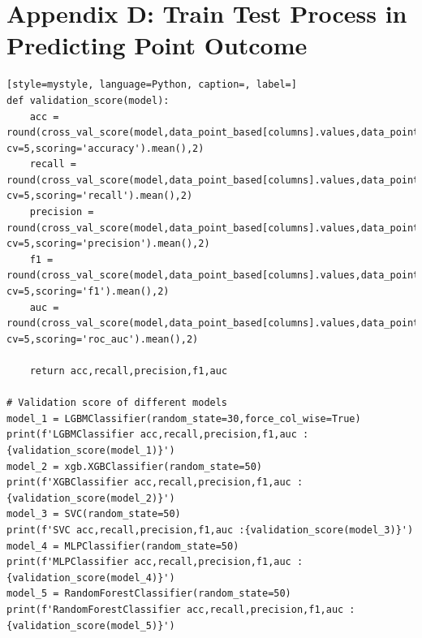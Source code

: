 \documentclass[12pt]{article}
\begin{document}
\section*{Appendix D: Train Test Process in Predicting Point Outcome}
\begin{lstlisting}[style=mystyle, language=Python, caption=, label=]
def validation_score(model):
    acc = round(cross_val_score(model,data_point_based[columns].values,data_point_based['point_label'].values, cv=5,scoring='accuracy').mean(),2)
    recall = round(cross_val_score(model,data_point_based[columns].values,data_point_based['point_label'].values, cv=5,scoring='recall').mean(),2)
    precision = round(cross_val_score(model,data_point_based[columns].values,data_point_based['point_label'].values, cv=5,scoring='precision').mean(),2)
    f1 = round(cross_val_score(model,data_point_based[columns].values,data_point_based['point_label'].values, cv=5,scoring='f1').mean(),2)
    auc = round(cross_val_score(model,data_point_based[columns].values,data_point_based['point_label'].values, cv=5,scoring='roc_auc').mean(),2)

    return acc,recall,precision,f1,auc

# Validation score of different models
model_1 = LGBMClassifier(random_state=30,force_col_wise=True)
print(f'LGBMClassifier acc,recall,precision,f1,auc :{validation_score(model_1)}')
model_2 = xgb.XGBClassifier(random_state=50)
print(f'XGBClassifier acc,recall,precision,f1,auc :{validation_score(model_2)}')
model_3 = SVC(random_state=50)
print(f'SVC acc,recall,precision,f1,auc :{validation_score(model_3)}')
model_4 = MLPClassifier(random_state=50)
print(f'MLPClassifier acc,recall,precision,f1,auc :{validation_score(model_4)}')
model_5 = RandomForestClassifier(random_state=50)
print(f'RandomForestClassifier acc,recall,precision,f1,auc :{validation_score(model_5)}')
\end{lstlisting}

\end{document}
